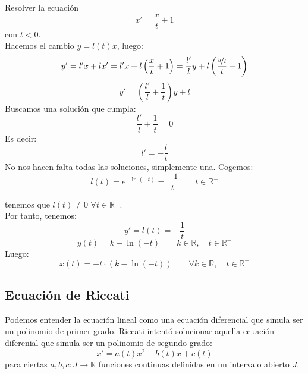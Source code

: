 \begin{ejemplo}
    Resolver la ecuación
    \begin{equation*}
        x' = \dfrac{x}{t} + 1
    \end{equation*}
    con $t<0$.\\

    Hacemos el cambio $y=l(t)x$, luego:
    \begin{equation*}
        y' = l'x + lx' = l' x + l\left(\dfrac{x}{t}+1\right) = \dfrac{l'}{l}y + l\left(\dfrac{\nicefrac{y}{l}}{t}+1\right)
    \end{equation*}
    \begin{equation*}
        y' = \left(\dfrac{l'}{l}+\dfrac{1}{t}\right) y + l
    \end{equation*}
    Buscamos una solución que cumpla:
    \begin{equation*}
        \dfrac{l'}{l}+\dfrac{1}{t} = 0
    \end{equation*}
    Es decir:
    \begin{equation*}
        l' = -\dfrac{l}{t}
    \end{equation*}
    No nos hacen falta todas las soluciones, simplemente una. Cogemos:
    \begin{equation*}
        l(t) = e^{-\ln(-t)} = \dfrac{-1}{t} \qquad t\in \mathbb{R}^-
    \end{equation*}

    tenemos que $l(t)\neq 0$ $\forall t\in \mathbb{R}^-$.\\

    Por tanto, tenemos:
    \begin{equation*}
        y' = l(t) = -\dfrac{1}{t}
    \end{equation*}
    \begin{equation*}
        y(t) = k - \ln(-t) \qquad k\in \mathbb{R}, \quad t\in \mathbb{R}^-
    \end{equation*}
    Luego:
    \begin{equation*}
        x(t) = -t\cdot (k-\ln(-t)) \qquad \forall k\in \mathbb{R}, \quad t\in \mathbb{R}^-
    \end{equation*}
\end{ejemplo}

\subsection{Ecuación de Riccati}
Podemos entender la ecuación lineal como una ecuación diferencial que simula ser un polinomio de primer grado. Riccati intentó solucionar aquella ecuación diferenial que simula ser un polinomio de segundo grado:
\begin{equation*}
    x' = a(t) x^2+b(t)x+c(t)
\end{equation*}
para ciertas $a,b,c:J\rightarrow\mathbb{R}$ funciones continuas definidas en un intervalo abierto $J$.
